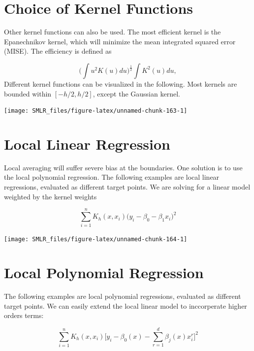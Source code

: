 \documentclass[
]{book}
\theoremstyle{definition}
\theoremstyle{definition}
\theoremstyle{definition}
\theoremstyle{definition}
\theoremstyle{remark}
\begin{document}
\hypertarget{choice-of-kernel-functions}{%
\section{Choice of Kernel Functions}\label{choice-of-kernel-functions}}

Other kernel functions can also be used. The most efficient kernel is the Epanechnikov kernel, which will minimize the mean integrated squared error (MISE). The efficiency is defined as

\[ \Big(\int u^2K(u) du\Big)^\frac{1}{2}  \int K^2(u) du, \]
Different kernel functions can be visualized in the following. Most kernels are bounded within \([-h/2, h/2]\), except the Gaussian kernel.

\begin{center}\texttt{[image: SMLR\_files/figure-latex/unnamed-chunk-163-1]} \end{center}

\hypertarget{local-linear-regression}{%
\section{Local Linear Regression}\label{local-linear-regression}}

Local averaging will suffer severe bias at the boundaries. One solution is to use the local polynomial regression. The following examples are local linear regressions, evaluated as different target points. We are solving for a linear model weighted by the kernel weights

\[\sum_{i = 1}^n K_h(x, x_i) \big( y_i - \beta_0 - \beta_1 x_i \big)^2\]

\begin{center}\texttt{[image: SMLR\_files/figure-latex/unnamed-chunk-164-1]} \end{center}

\hypertarget{local-polynomial-regression}{%
\section{Local Polynomial Regression}\label{local-polynomial-regression}}

The following examples are local polynomial regressions, evaluated as different target points. We can easily extend the local linear model to inccorperate higher orders terms:

\[\sum_{i=1}^n K_h(x, x_i) \Big[ y_i - \beta_0(x) - \sum_{r=1}^d \beta_j(x) x_i^r \Big]^2\]
\end{document}
